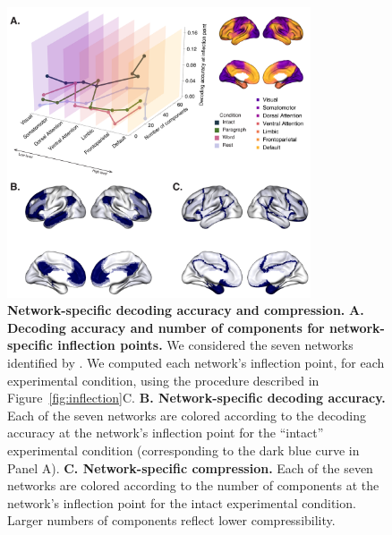 \documentclass[english, 11pt]{article}
\begin{document}




\begin{figure}
  \centering
  \includegraphics[width=0.8\textwidth]{figs/decode_pcs_network}

  \caption{\textbf{Network-specific decoding accuracy and compression.}
  \textbf{A. Decoding accuracy and number of components for network-specific
  inflection points.} We considered the seven networks identified by
  \cite{YeoEtal11}. We computed each network's inflection point, for each
  experimental condition, using the procedure described in
  Figure~\ref{fig:inflection}C. \textbf{B. Network-specific decoding
  accuracy.} Each of the seven networks are colored according to the decoding
  accuracy at the network's inflection point for the ``intact'' experimental
  condition (corresponding to the dark blue curve in Panel A). \textbf{C.
  Network-specific compression.} Each of the seven networks are colored
  according to the number of components at the network's inflection point for
  the intact experimental condition. Larger numbers of components reflect lower
  compressibility.}

  \label{fig:networks}
\end{figure}
\end{document}
